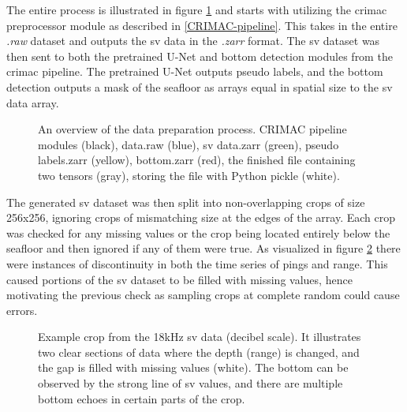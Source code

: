         The entire process is illustrated in figure \ref{data_generation_flowchart_fig} and starts with utilizing the \gls{crimac} preprocessor module as described in \ref{CRIMAC-pipeline}. This takes in the entire \textit{.raw} dataset and outputs the \gls{sv} data in the \textit{.zarr} format. The \gls{sv} dataset was then sent to both the pretrained U-Net and bottom detection modules from the \gls{crimac} pipeline. The pretrained U-Net outputs pseudo labels, and the bottom detection outputs a mask of the seafloor as arrays equal in spatial size to the \gls{sv} data array.
        \begin{figure}[H]
            \centering
            
            \caption[Data preparation process]{An overview of the data preparation process. CRIMAC pipeline modules (black), data.raw (blue), \gls{sv} data.zarr (green), pseudo labels.zarr (yellow), bottom.zarr (red), the finished file containing two tensors (gray), storing the file with Python pickle (white).}
          	\medskip 
            \label{data_generation_flowchart_fig}
        \end{figure}
        The generated \gls{sv} dataset was then split into non-overlapping crops of size 256x256, ignoring crops of mismatching size at the edges of the array. Each crop was checked for any missing values or the crop being located entirely below the seafloor and then ignored if any of them were true. As visualized in figure \ref{data_bottom_nans_fig} there were instances of discontinuity in both the time series of pings and range. This caused portions of the \gls{sv} dataset to be filled with missing values, hence motivating the previous check as sampling crops at complete random could cause errors.
                \begin{figure}[H]
            \centering
            
            \caption[Missing values and bottom]{Example crop from the 18kHz \gls{sv} data (decibel scale). It illustrates two clear sections of data where the depth (range) is changed, and the gap is filled with missing values (white). The bottom can be observed by the strong line of \gls{sv} values, and there are multiple bottom echoes in certain parts of the crop.}
          	\medskip 
            \label{data_bottom_nans_fig}
        \end{figure}
        
